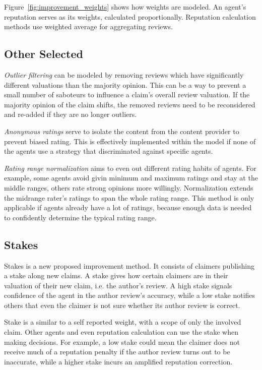 \documentclass[%
    ]{\PathToTumTemplate/thesis/tum_thesis}
\begin{document}
Figure~\ref{fig:improvement_weights} shows how weights are modeled.
An agent's reputation serves as its weights, calculated proportionally.
Reputation calculation methods use weighted average for aggregating reviews.


\subsection{Other Selected}

\emph{Outlier filtering} can be modeled by removing reviews which have significantly different valuations than the majority opinion.
This can be a way to prevent a small number of saboteurs to influence a claim's overall review valuation.
If the majority opinion of the claim shifts, the removed reviews need to be reconsidered and re-added if they are no longer outliers.

\emph{Anonymous ratings} serve to isolate the content from the content provider to prevent biased rating.
This is effectively implemented within the model if none of the agents use a strategy that discriminated against specific agents.

\emph{Rating range normalization} aims to even out different rating habits of agents.
For example, some agents avoid givin minimum and maximum ratings and stay at the middle ranges, others rate strong opinions more willingly.
Normalization extends the midrange rater's ratings to span the whole rating range.
This method is only applicable if agents already have a lot of ratings, because enough data is needed to confidently determine the typical rating range.


\subsection{Stakes}

Stakes is a new proposed improvement method.
It consists of claimers publishing a stake along new claims.
A stake gives how certain claimers are in their valuation of their new claim, i.e. the author's review.
A high stake signals confidence of the agent in the author review's accuracy, while a low stake notifies others that even the claimer is not sure whether its author review is correct.

Stake is a similar to a self reported weight, with a scope of only the involved claim.
Other agents and even reputation calculation can use the stake when making decisions.
For example, a low stake could mean the claimer does not receive much of a reputation penalty if the author review turns out to be inaccurate, while a higher stake incurs an amplified reputation correction.
\end{document}
